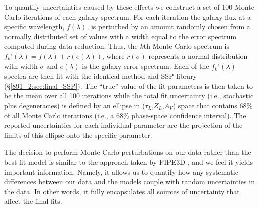 To quantify uncertainties caused by these effects we construct a set
of 100 Monte Carlo iterations of each galaxy spectrum. For each
iteration the galaxy flux at a specific wavelength, $f(\lambda)$, is
perturbed by an amount randomly chosen from a normally distributed set
of values with a width equal to the error spectrum computed during
data reduction. Thus, the $k$th Monte Carlo spectrum is $f_k'(\lambda)
= f(\lambda) + r(e(\lambda))$, where $r(\sigma)$ represents a normal
distribution with width $\sigma$ and $e(\lambda)$ is the galaxy error
spectrum. Each of the $f_k'(\lambda)$ spectra are then fit with the
identical method and SSP library (\S\ref{891_2:sec:final_SSP}). The ``true''
value of the fit parameters is then taken to be the mean over all 100
iterations while the total fit uncertainty (i.e., stochastic plus
degeneracies) is defined by an ellipse in ($\tau_L$,$Z_L$,$A_V$) space
that contains 68\% of all Monte Carlo iterations (i.e., a 68\%
phase-space confidence interval). The reported uncertainties for each
individual parameter are the projection of the limits of this ellipse
onto the specific parameter.

The decision to perform Monte Carlo perturbations on our data rather
than the best fit model is similar to the approach taken by PIPE3D
\citep{Sanchez16}, and we feel it yields important
information. Namely, it allows us to quantify how any systematic
differences between our data and the models couple with random
uncertainties in the data. In other words, it fully encapsulates all
sources of uncertainty that affect the final fits.



